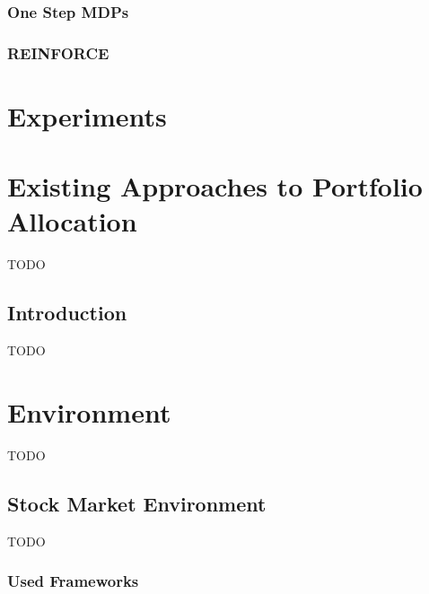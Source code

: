 \subsection{One Step MDPs}\label{subsec:one-step-mdps}

\subsection{REINFORCE}\label{subsec:reinforce}




\chapter{Experiments}\label{ch:experiments}




\chapter{Existing Approaches to Portfolio Allocation}\label{ch:existing-approaches-to-portfolio-allocation}
TODO


\section{Introduction}\label{sec:introduction}
TODO




\chapter{Environment}\label{ch:environment}
TODO


\section{Stock Market Environment}\label{sec:stock-market-environment}
TODO

\subsection{Used Frameworks}\label{subsec:used-frameworks}


